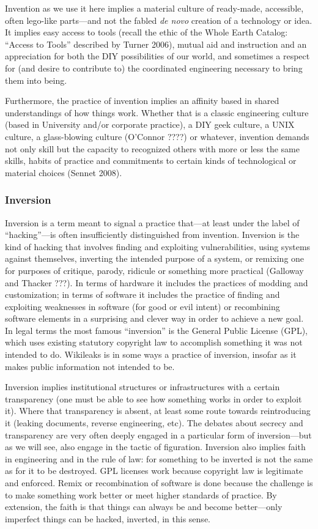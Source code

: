 \documentclass[10pt,letter,oneside]{scrartcl}
\begin{document}
Invention as we use it here implies a material culture of ready-made,
accessible, often lego-like parts---and not the fabled \emph{de novo} creation
of a technology or idea.  It implies easy access to tools (recall the ethic of
the Whole Earth Catalog: ``Access to Tools'' described by Turner 2006), mutual
aid and instruction and an appreciation for both the DIY possibilities of our
world, and sometimes a respect for (and desire to contribute to) the
coordinated engineering necessary to bring them into being.

Furthermore, the practice of invention implies an affinity based in shared
understandings of how things work.  Whether that is a classic engineering
culture (based in University and/or corporate practice), a DIY geek culture, a
UNIX culture, a glass-blowing culture (O’Connor ????) or whatever, invention
demands not only skill but the capacity to recognized others with more or less
the same skills, habits of practice and commitments to certain kinds of
technological or material choices (Sennet 2008).

\subsubsection{Inversion}

Inversion is a term meant to signal a practice that---at least under the label
of ``hacking''---is often insufficiently distinguished from invention.
Inversion is the kind of hacking that involves finding and exploiting
vulnerabilities, using systems against themselves, inverting the intended
purpose of a system, or remixing one for purposes of critique, parody, ridicule
or something more practical (Galloway and Thacker ???).  In terms of hardware
it includes the practices of modding and customization; in terms of software it
includes the practice of finding and exploiting weaknesses in software (for
good or evil intent) or recombining software elements in a surprising and
clever way in order to achieve a new goal.  In legal terms the most famous
``inversion'' is the General Public License (GPL), which uses existing
statutory copyright law to accomplish something it was not intended to do.
Wikileaks is in some ways a practice of inversion, insofar as it makes public
information not intended to be. 

Inversion implies institutional structures or infrastructures with a certain
transparency (one must be able to see how something works in order to exploit
it).  Where that transparency is absent, at least some route towards
reintroducing it (leaking documents, reverse engineering, etc). The debates
about secrecy and transparency are very often deeply engaged in a particular
form of inversion---but as we will see, also engage in the tactic of
figuration.  Inversion also implies faith in engineering and in the rule of
law: for something to be inverted is not the same as for it to be destroyed.
GPL licenses work because copyright law is legitimate and enforced.  Remix or
recombination of software is done because the challenge is to make something
work better or meet higher standards of practice.  By extension, the faith is
that things can always be and become better—only imperfect things can be
hacked, inverted, in this sense.
\end{document}
